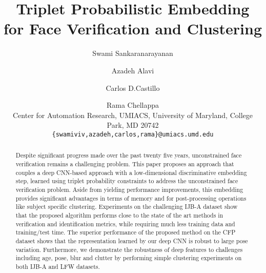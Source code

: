 \documentclass[10pt,twocolumn,letterpaper]{article}
\begin{document}
\title{Triplet Probabilistic Embedding for Face Verification and Clustering}
\author{Swami Sankaranarayanan \and Azadeh Alavi \and Carlos D.Castillo \and Rama Chellappa \vspace{1mm} \\ 
Center for Automation Research, UMIACS, University of Maryland, College Park, MD 20742\\
{\tt\small \{swamiviv,azadeh,carlos,rama\}@umiacs.umd.edu}
}
\maketitle
\thispagestyle{empty}
\begin{abstract}
   Despite significant progress made over the past twenty five years,
   unconstrained face verification remains a challenging problem. This
   paper proposes an approach that couples a deep CNN-based approach with a
   low-dimensional discriminative embedding step, learned using triplet probability
   constraints to address the unconstrained face verification problem. Aside from
   yielding performance improvements, this embedding provides significant
   advantages in terms of memory and for post-processing operations like subject
   specific clustering. Experiments on the challenging IJB-A dataset show that
   the proposed algorithm performs close to the state of the
   art methods in verification and identification metrics, while requiring much
   less training data and training/test time. The superior performance of the
   proposed method on the CFP dataset shows that the representation learned by
   our deep CNN is robust to large pose variation. Furthermore, we demonstrate
   the robustness of deep features to challenges including age, pose, blur
   and clutter by performing simple clustering experiments on both IJB-A and LFW
   datasets.
\end{abstract}
\end{document}
